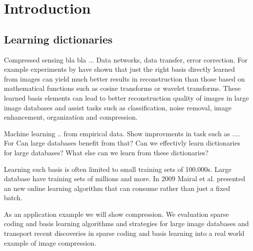 \chapter{Introduction}
\label{sec:introduction}
\section{Learning dictionaries}

Compressed sensing bla bla ...
Data networks, data transfer, error correction. For example experiments by
\cite{} have shown that just the right basis directly learned from images can
yield much better results in reconstruction than those based on mathematical
functions such as cosine transforms or wavelet\cite{Elad2006,Mairal2010}
transforms. These learned basis elements can lead to better reconstruction
quality of images in large image databases and assist tasks such as
classification, noise removal, image enhancement, organization and compression. 

Machine learning .. from empirical data.
Show improvments in task such as ....
For 
Can large databases benefit from that? Can we effectivly learn dictionaries for
large databases? What else can we learn from these dictionaries?



Learning such basis is often limited to small training sets of 100.000s. Large
database have training sets of millions and more.
In 2009 Mairal et al.\cite{Mairal2009} presented an new online learning
algorithm that can consume  rather than just a fixed batch. 

As an application example we will show compression. We evaluation sparse coding
and basis learning algorithms and strategies for large image databases and
transport recent discoveries in sparse coding and basis learning into a real
world example of image compression.

